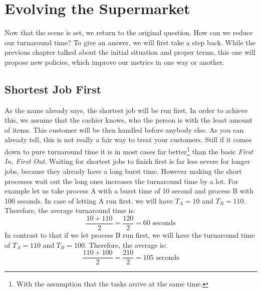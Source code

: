 \section{Evolving the Supermarket}

Now that the scene is set, we return to the original question.
How can we reduce our turnaround time?
To give an answer, we will first take a step back.
While the previous chapter talked about the initial situation and proper terms, this one will propose new policies, which improve our metrics in one way or another.

\subsection{Shortest Job First}

As the name already says, the shortest job will be run first.
In order to achieve this, we assume that the cashier knows, who the person is with the least amount of items.
This customer will be then handled before anybody else. As you can already tell, this is not really a fair way to treat your customers.
Still if it comes down to pure turnaround time it is in most cases far better\footnote{With the assumption that the tasks arrive at the same time.} than the basic \emph{First In, First Out}.
Waiting for shortest jobs to finish first is far less severe for longer jobs, because they already have a long burst time. However making the short processes wait out the long ones increases the turnaround time by a lot.
For example let us take process A with a burst time of 10 second and process B with 100 seconds. In case of letting A run first, we will have $T_A = 10$ and $T_B = 110$.
Therefore, the average turnaround time is:
$$\frac{10 + 110}{2} = \frac{120}{2} = 60 \text{ seconds}$$
In contrast to that if we let process B run first, we will have the turnaround time of $T_A = 110$ and $T_B = 100$. Therefore, the average is:
$$\frac{110 + 100}{2} = \frac{210}{2} = 105 \text{ seconds}$$



